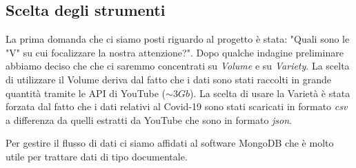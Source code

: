 \subsection*{Scelta degli strumenti}
La prima domanda che ci siamo posti riguardo al progetto è stata: "Quali sono le "V" su cui focalizzare la nostra attenzione?".
Dopo qualche indagine preliminare abbiamo deciso che che ci saremmo concentrati su \textit{Volume} e su \textit{Variety}. La scelta di utilizzare il Volume deriva dal fatto che i dati sono stati raccolti in grande quantità tramite le API di YouTube ($\sim 3Gb$).
La scelta di usare la Varietà è stata forzata dal fatto che i dati relativi al Covid-19 sono stati scaricati in formato \textit{csv} a differenza da quelli estratti da YouTube che sono in formato \textit{json}. 

Per gestire il flusso di dati ci siamo affidati al software MongoDB che è molto utile per trattare dati di tipo documentale.  
